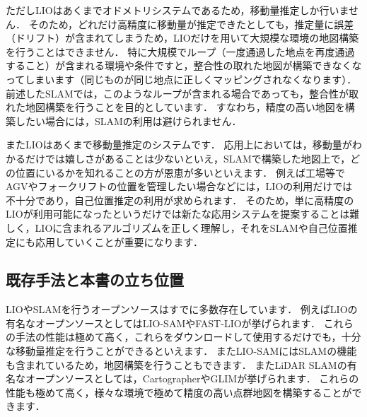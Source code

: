 ただしLIOはあくまでオドメトリシステムであるため，移動量推定しか行いません．
そのため，どれだけ高精度に移動量が推定できたとしても，推定量に誤差（ドリフト）が含まれてしまうため，LIOだけを用いて大規模な環境の地図構築を行うことはできません．
特に大規模でループ（一度通過した地点を再度通過すること）が含まれる環境や条件ですと，整合性の取れた地図が構築できなくなってしまいます（同じものが同じ地点に正しくマッピングされなくなります）．
前述したSLAMでは，このようなループが含まれる場合であっても，整合性が取れた地図構築を行うことを目的としています．
すなわち，精度の高い地図を構築したい場合には，SLAMの利用は避けられません．

またLIOはあくまで移動量推定のシステムです．
応用上においては，移動量がわかるだけでは嬉しさがあることは少ないといえ，SLAMで構築した地図上で，どの位置にいるかを知れることの方が恩恵が多いといえます．
例えば工場等でAGVやフォークリフトの位置を管理したい場合などには，LIOの利用だけでは不十分であり，自己位置推定の利用が求められます．
そのため，単に高精度のLIOが利用可能になったというだけでは新たな応用システムを提案することは難しく，LIOに含まれるアルゴリズムを正しく理解し，それをSLAMや自己位置推定にも応用していくことが重要になります．





\subsection{既存手法と本書の立ち位置}

LIOやSLAMを行うオープンソースはすでに多数存在しています．
例えばLIOの有名なオープンソースとしてはLIO-SAMやFAST-LIOが挙げられます．
これらの手法の性能は極めて高く，これらをダウンロードして使用するだけでも，十分な移動量推定を行うことができるといえます．
またLIO-SAMにはSLAMの機能も含まれているため，地図構築を行うこともできます．
またLiDAR SLAMの有名なオープンソースとしては，CartographerやGLIMが挙げられます．
これらの性能も極めて高く，様々な環境で極めて精度の高い点群地図を構築することができます．

